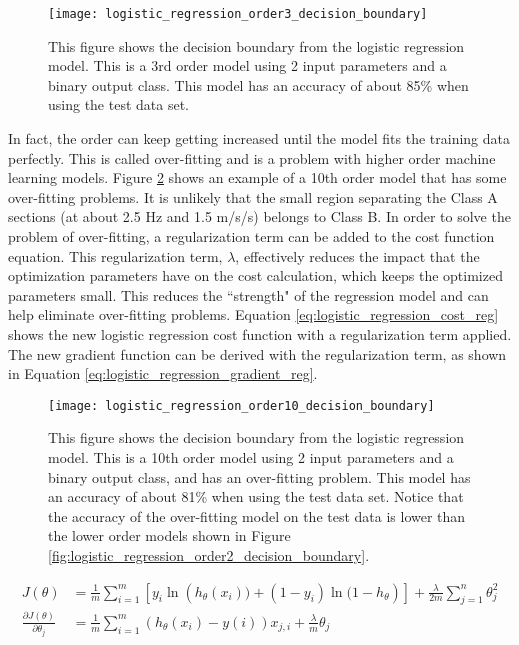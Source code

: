 \begin{figure}
	\centering
	\texttt{[image: logistic\_regression\_order3\_decision\_boundary]}
	\decoRule
	\caption{This figure shows the decision boundary from the logistic regression model.  This is a 3rd order model using 2 input parameters and a binary output class.  This model has an accuracy of about 85\% when using the test data set.}
	\label{fig:logistic_regression_order3_decision_boundary}
\end{figure}

In fact, the order can keep getting increased until the model fits the training data perfectly.  This is called over-fitting and is a problem with higher order machine learning models.  Figure \ref{fig:logistic_regression_order10_decision_boundary} shows an example of a 10th order model that has some over-fitting problems.  It is unlikely that the small region separating the Class A sections (at about 2.5 Hz and 1.5 m/s/s) belongs to Class B.  In order to solve the problem of over-fitting, a regularization term can be added to the cost function equation.  This regularization term, $\lambda$, effectively reduces the impact that the optimization parameters have on the cost calculation, which keeps the optimized parameters small.  This reduces the ``strength" of the regression model and can help eliminate over-fitting problems.  Equation \ref{eq:logistic_regression_cost_reg} shows the new logistic regression cost function with a regularization term applied.  The new gradient function can be derived with the regularization term, as shown in Equation \ref{eq:logistic_regression_gradient_reg}.

\begin{figure}
	\centering
	\texttt{[image: logistic\_regression\_order10\_decision\_boundary]}
	\decoRule
	\caption{This figure shows the decision boundary from the logistic regression model.  This is a 10th order model using 2 input parameters and a binary output class, and has an over-fitting problem.  This model has an accuracy of about 81\% when using the test data set.  Notice that the accuracy of the over-fitting model on the test data is lower than the lower order models shown in Figure \ref{fig:logistic_regression_order2_decision_boundary}.}
	\label{fig:logistic_regression_order10_decision_boundary}
\end{figure}

\begin{align}
	J(\theta) &= \frac{1}{m} \sum_{i=1}^{m}{\left[y_i \ln({h_{\theta}(x_i))} + (1-y_i) \ln{(1-h_{\theta}}) \right]} + \frac{\lambda}{2m} \sum_{j=1}^{n}{\theta_j^2} \label{eq:logistic_regression_cost_reg} \\	
	\frac{\partial J(\theta)}{\partial \theta_j} &= \frac{1}{m} \sum_{i=1}^{m}{\left(h_{\theta}(x_i) - y(i)\right) x_{j,i}} + \frac{\lambda}{m} \theta_j\label{eq:logistic_regression_gradient_reg}
\end{align}


